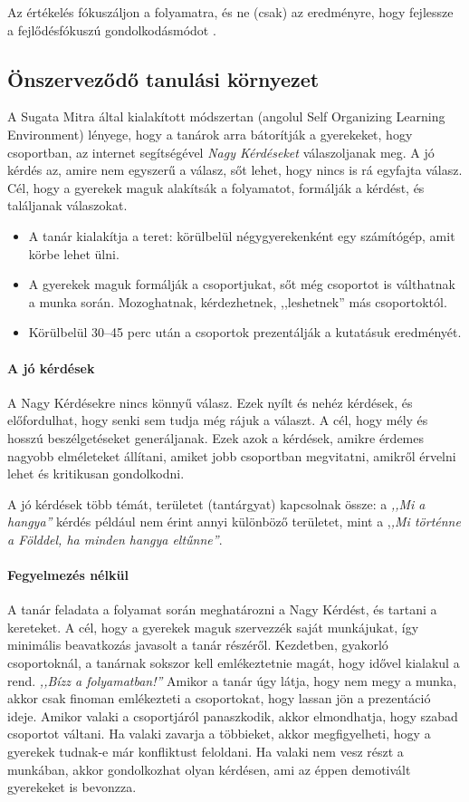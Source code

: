 Az értékelés fókuszáljon a folyamatra, és ne (csak)  az eredményre, hogy fejlessze a fejlődésfókuszú gondolkodásmódot \citep{growthmindset}.

\subsection{Önszerveződő tanulási környezet}
A Sugata Mitra által kialakított módszertan (angolul Self Organizing Learning Environment) lényege, hogy a tanárok arra bátorítják a gyerekeket, hogy csoportban, az internet segítségével \emph{Nagy Kérdéseket} válaszoljanak meg. A jó kérdés az, amire nem egyszerű a válasz, sőt lehet, hogy nincs is rá egyfajta válasz. Cél, hogy a gyerekek maguk alakítsák a folyamatot, formálják a kérdést, és találjanak válaszokat.

\begin{itemize}
      \item A tanár kialakítja a teret: körülbelül négygyerekenként egy számítógép, amit körbe lehet ülni.
      \item A gyerekek maguk formálják a csoportjukat, sőt még csoportot is válthatnak a munka során. Mozoghatnak, kérdezhetnek, ,,leshetnek''
más csoportoktól.
      \item Körülbelül 30--45 perc után a csoportok prezentálják a kutatásuk eredményét.
\end{itemize}

\paragraph{A jó kérdések}
A Nagy Kérdésekre nincs könnyű válasz. Ezek nyílt és nehéz kérdések, és előfordulhat, hogy senki sem tudja még rájuk a választ. A cél, hogy mély és hosszú beszélgetéseket generáljanak. Ezek azok a kérdések, amikre érdemes nagyobb elméleteket állítani, amiket jobb csoportban megvitatni, amikről érvelni lehet és kritikusan gondolkodni.

A jó kérdések több témát, területet (tantárgyat) kapcsolnak össze: a \emph{,,Mi a
      hangya''} kérdés például nem érint annyi különböző területet, mint a ,\emph{,Mi
      történne a Földdel, ha minden hangya eltűnne''}.

\paragraph{Fegyelmezés nélkül}
A tanár feladata a folyamat során meghatározni a\linebreak
Nagy Kérdést, és tartani a kereteket. A cél, hogy a gyerekek maguk szervezzék saját munkájukat, így minimális beavatkozás javasolt a tanár részéről. Kezdetben, gyakorló csoportoknál, a tanárnak sokszor kell emlékeztetnie magát, hogy idővel kialakul a rend. \emph{,,Bízz a
      folyamatban!''
} Amikor a tanár úgy látja, hogy nem megy a munka, akkor csak finoman emlékezteti a csoportokat, hogy lassan jön a prezentáció ideje. Amikor valaki a csoportjáról panaszkodik, akkor elmondhatja, hogy szabad csoportot váltani. Ha valaki zavarja a többieket, akkor megfigyelheti, hogy a gyerekek tudnak-e már konfliktust feloldani. Ha valaki nem vesz részt a munkában, akkor gondolkozhat olyan kérdésen, ami az éppen demotivált gyerekeket is bevonzza.

